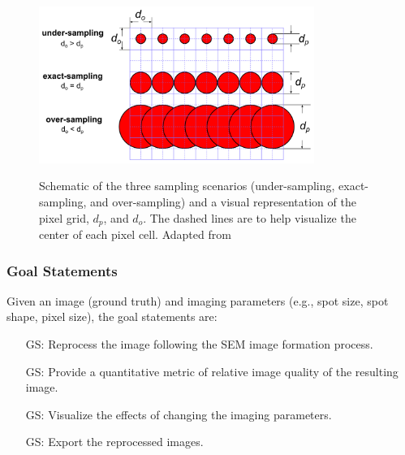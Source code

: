 \documentclass[12pt]{article}
\newcounter{goalnum} %
\begin{document}
\begin{figure}[h!]
\begin{center}
{
 \includegraphics[width=0.8\textwidth]{figures/sampling.png}
}
\caption{\label{fig_sampling} Schematic of the three sampling scenarios (under-sampling, exact-sampling, and over-sampling) and a visual representation of the pixel grid, $d_p$, and $d_o$. The dashed lines are to help visualize the center of each pixel cell. Adapted from \citet{lifshin_improving_2014}}
\end{center}
\end{figure}

\subsubsection{Goal Statements}

\noindent Given an image (ground truth) and imaging parameters (e.g., spot size, spot shape, pixel size), the goal statements are:

\begin{itemize}

\item[GS\refstepcounter{goalnum}\thegoalnum \label{G_reprocess}:] {
Reprocess the image following the SEM image formation process.
}

\item[GS\refstepcounter{goalnum}\thegoalnum \label{G_metric}:] {
Provide a quantitative metric of relative image quality of the resulting image.
}

\item[GS\refstepcounter{goalnum}\thegoalnum \label{G_visualize}:] {
Visualize the effects of changing the imaging parameters.
}

\item[GS\refstepcounter{goalnum}\thegoalnum \label{G_export}:] {
Export the reprocessed images.
}

\end{itemize}
\end{document}
